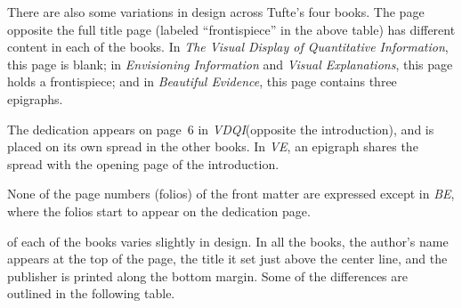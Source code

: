 \documentclass[a4paper,nofonts,notoc,oneside,openany,nobib]{tufte-book}
\newcommand{\vdqi}{\textit{VDQI}\xspace}
\newcommand{\ve}{\textit{VE}\xspace}
\newcommand{\be}{\textit{BE}\xspace}
\newcommand{\VDQI}{\textit{The Visual Display of Quantitative Information}\xspace}
\newcommand{\EI}{\textit{Envisioning Information}\xspace}
\newcommand{\VE}{\textit{Visual Explanations}\xspace}
\newcommand{\BE}{\textit{Beautiful Evidence}\xspace}
\begin{document}
\vspace{-7\baselineskip}
\vspace{7\baselineskip}

There are also some variations in design across Tufte's four books.  The
page opposite the full title page (labeled ``frontispiece'' in the above
table) has different content in each of the books.  In \VDQI, this page is
blank; in \EI and \VE, this page holds a frontispiece; and in \BE, this
page contains three epigraphs.

The dedication appears on page~6 in \vdqi (opposite the introduction), and
is placed on its own spread in the other books.  In \ve, an epigraph shares
the spread with the opening page of the introduction.

None of the page numbers (folios) of the front matter are expressed except in
\be, where the folios start to appear on the dedication page.

 of each of the books varies slightly in
design.  In all the books, the author's name appears at the top of the
page, the title it set just above the center line, and the publisher is
printed along the bottom margin.  Some of the differences are outlined in
the following table.
\end{document}
